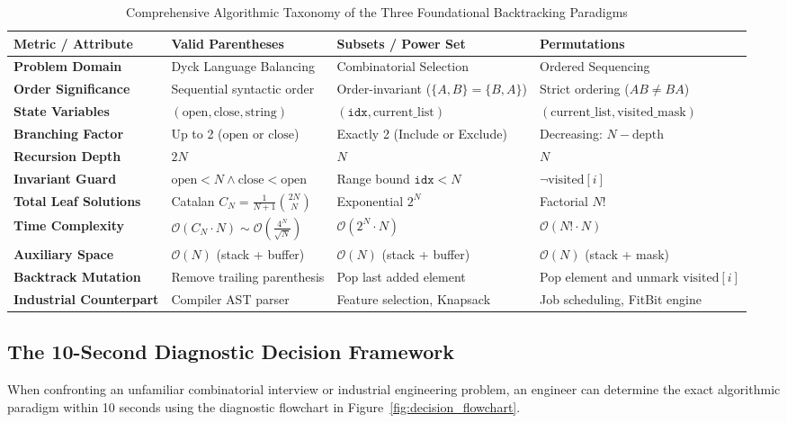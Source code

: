 \documentclass[10pt,journal,compsoc,onecolumn]{IEEEtran}
\begin{document}
\begin{table}[htbp]
\centering
\caption{Comprehensive Algorithmic Taxonomy of the Three Foundational Backtracking Paradigms}
\label{tab:master_comparison}
\begin{tabular}{llll}
\toprule
\textbf{Metric / Attribute} & \textbf{Valid Parentheses} & \textbf{Subsets / Power Set} & \textbf{Permutations} \\
\midrule
\textbf{Problem Domain} & Dyck Language Balancing & Combinatorial Selection & Ordered Sequencing \\
\textbf{Order Significance} & Sequential syntactic order & Order-invariant ($\{A,B\}=\{B,A\}$) & Strict ordering ($AB \neq BA$) \\
\textbf{State Variables} & $(\text{open}, \text{close}, \text{string})$ & $(\texttt{idx}, \text{current\_list})$ & $(\text{current\_list}, \text{visited\_mask})$ \\
\textbf{Branching Factor} & Up to 2 ($\text{open}$ or $\text{close}$) & Exactly 2 (Include or Exclude) & Decreasing: $N - \text{depth}$ \\
\textbf{Recursion Depth} & $2N$ & $N$ & $N$ \\
\textbf{Invariant Guard} & $\text{open} < N \land \text{close} < \text{open}$ & Range bound $\texttt{idx} < N$ & $\neg \text{visited}[i]$ \\
\textbf{Total Leaf Solutions} & Catalan $C_N = \frac{1}{N+1}\binom{2N}{N}$ & Exponential $2^N$ & Factorial $N!$ \\
\textbf{Time Complexity} & $\mathcal{O}(C_N \cdot N) \sim \mathcal{O}(\frac{4^N}{\sqrt{N}})$ & $\mathcal{O}(2^N \cdot N)$ & $\mathcal{O}(N! \cdot N)$ \\
\textbf{Auxiliary Space} & $\mathcal{O}(N)$ (stack + buffer) & $\mathcal{O}(N)$ (stack + buffer) & $\mathcal{O}(N)$ (stack + mask) \\
\textbf{Backtrack Mutation} & Remove trailing parenthesis & Pop last added element & Pop element and unmark $\text{visited}[i]$ \\
\textbf{Industrial Counterpart} & Compiler AST parser & Feature selection, Knapsack & Job scheduling, FitBit engine \\
\bottomrule
\end{tabular}
\end{table}

\subsection{The 10-Second Diagnostic Decision Framework}
When confronting an unfamiliar combinatorial interview or industrial engineering problem, an engineer can determine the exact algorithmic paradigm within 10 seconds using the diagnostic flowchart in Figure~\ref{fig:decision_flowchart}.
\end{document}

